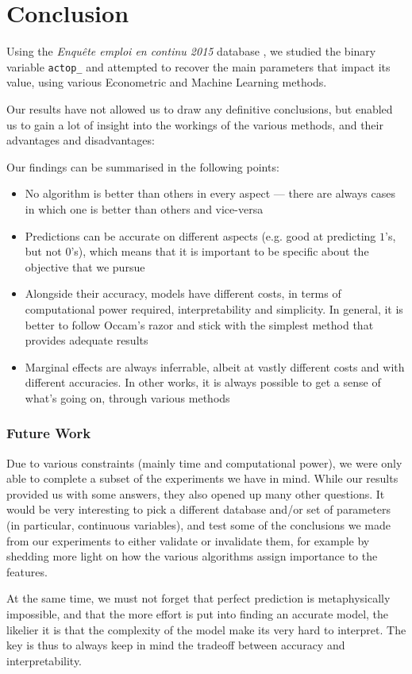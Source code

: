 \chapter{Conclusion}

Using the \textit{Enqu\^ete emploi en continu 2015} database \cite{enquete}, we studied the binary variable \texttt{actop\_} and attempted to recover the main parameters that impact its value, using various Econometric and Machine Learning methods.

Our results have not allowed us to draw any definitive conclusions, but enabled us to gain a lot of insight into the workings of the various methods, and their advantages and disadvantages:

Our findings can be summarised in the following points:

\begin{itemize}
    \item No algorithm is better than others in every aspect --- there are always cases in which one is better than others and vice-versa
    \item Predictions can be accurate on different aspects (e.g. good at predicting $1$'s, but not $0$'s), which means that it is important to be specific about the objective that we pursue
    \item Alongside their accuracy, models have different costs, in terms of computational power required, interpretability and simplicity. In general, it is better to follow Occam's razor and stick with the simplest method that provides adequate results
    \item Marginal effects are always inferrable, albeit at vastly different costs and with different accuracies. In other works, it is always possible to get a sense of what’s going on, through various methods
\end{itemize}

\subsection{Future Work}

Due to various constraints (mainly time and computational power), we were only able to complete a subset of the experiments we have in mind. While our results provided us with some answers, they also opened up many other questions. It would be very interesting to pick a different database and/or set of parameters (in particular, continuous variables), and test some of the conclusions we made from our experiments to either validate or invalidate them, for example by shedding more light on how the various algorithms assign importance to the features.

At the same time, we must not forget that perfect prediction is metaphysically impossible, and that the more effort is put into finding an accurate model, the likelier it is that the complexity of the model make its very hard to interpret. The key is thus to always keep in mind the tradeoff between accuracy and interpretability.

